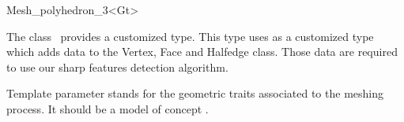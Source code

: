 \ccRefPageBegin


\begin{ccRefClass}{Mesh_polyhedron_3<Gt>}  %


\ccDefinition
  
The class \ccRefName\ provides a customized  type. This type uses
as  a customized type which adds data to the Vertex, Face and
Halfedge class. Those data are required to use our sharp features
detection algorithm.


\ccParameters

Template parameter  stands for the geometric traits associated
to the meshing process. It should be a model of concept .

\ccTypes


\ccSeeAlso


\end{ccRefClass}

\ccRefPageEnd

